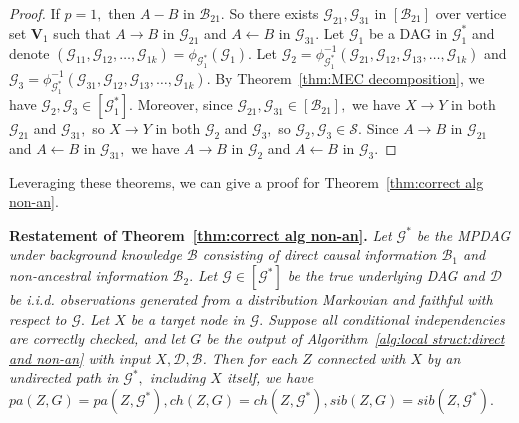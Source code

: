 \documentclass{article}
\begin{document}
\begin{proof}
If $p=1,$ then $A-B$ in $\mathcal{B}_{21}.$ So there exists $\mathcal{G}_{21},\mathcal{G}_{31}$ in $[\mathcal{B}_{21}]$ over vertice set $\mathbf{V}_1$ such that $A\to B$ in $\mathcal{G}_{21}$ and $A\leftarrow B$ in $\mathcal{G}_{31}.$ Let $\mathcal{G}_1$ be a DAG in $\mathcal{G}^*_1$ and denote $(\mathcal{G}_{11},\mathcal{G}_{12},\dots,\mathcal{G}_{1k})=\phi_{\mathcal{G}^*_1}(\mathcal{G}_1).$ Let $\mathcal{G}_2=\phi^{-1}_{\mathcal{G}^*_1}(\mathcal{G}_{21},\mathcal{G}_{12},\mathcal{G}_{13},\dots,\mathcal{G}_{1k})$ and $\mathcal{G}_3=\phi^{-1}_{\mathcal{G}^*_1}(\mathcal{G}_{31},\mathcal{G}_{12},\mathcal{G}_{13},\dots,\mathcal{G}_{1k}).$ By Theorem~\ref{thm:MEC decomposition}, we have $\mathcal{G}_2,\mathcal{G}_3\in [\mathcal{G}^*_1].$ Moreover, since $\mathcal{G}_{21},\mathcal{G}_{31}\in [\mathcal{B}_{21}],$ we have $X\to Y$ in both $\mathcal{G}_{21}$ and $\mathcal{G}_{31},$ so $X\to Y$ in both $\mathcal{G}_2$ and $\mathcal{G}_3,$ so $\mathcal{G}_2,\mathcal{G}_3\in \mathcal{S}.$ Since $A\to B$ in $\mathcal{G}_{21}$ and $A\leftarrow B$ in $\mathcal{G}_{31},$ we have $A\to B$ in $\mathcal{G}_2$ and $A\leftarrow B$ in $\mathcal{G}_3.$ 
\end{proof}

Leveraging these theorems, we can give a proof for Theorem~\ref{thm:correct alg non-an}.

\textbf{Restatement of Theorem~\ref{thm:correct alg non-an}.} \textit{Let $\mathcal{G}^*$ be the MPDAG under background knowledge $\mathcal{B}$ consisting of direct causal information $\mathcal{B}_1$ and non-ancestral information $\mathcal{B}_2.$ Let $\mathcal{G}\in [\mathcal{G}^*]$ be the true underlying DAG and $\mathcal{D}$ be i.i.d. observations generated from a distribution Markovian and faithful with respect to $\mathcal{G}.$ Let $X$ be a target node in $\mathcal{G}.$ Suppose all conditional independencies are correctly checked, and let $G$ be the output of Algorithm~\ref{alg:local struct:direct and non-an} with input $X,\mathcal{D},\mathcal{B}$.
Then for each $Z$ connected with $X$ by an undirected path in $\mathcal{G}^*,$ including $X$ itself, we have $pa(Z,G)=pa(Z,\mathcal{G}^*),ch(Z,G)=ch(Z,\mathcal{G}^*),sib(Z,G)=sib(Z,\mathcal{G}^*).$}
\end{document}
